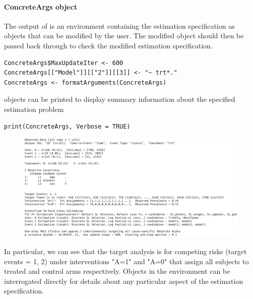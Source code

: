 \documentclass{report}
\newcommand{\1}{\ensuremath{\mathbf{1}}}
\begin{document}
\paragraph{ConcreteArgs object}
\label{concreteargs}
The  output of  is an environment containing the estimation specification as objects that can be modified by the user. The modified  object should then be passed back through  to check the modified estimation specification.

\begin{lstlisting}
ConcreteArgs$MaxUpdateIter <- 600
ConcreteArgs[["Model"]][["2"]][[3]] <- "~ trt*."
ConcreteArgs <- formatArguments(ConcreteArgs)
\end{lstlisting}

 objects can be printed to display summary information about the specified estimation problem

\begin{lstlisting}
print(ConcreteArgs, Verbose = TRUE)
\end{lstlisting}

\begin{figure}[H]
\includegraphics[width=\linewidth]{fig/ConcreteArgs.png}
\end{figure}

In particular, we can see that the target analysis is for competing risks (target events = 1, 2) under interventions "A=1" and "A=0" that assign all subjects to treated and control arms respectively. Objects in the  environment can be interrogated directly for details about any particular aspect of the estimation specification.
\end{document}
